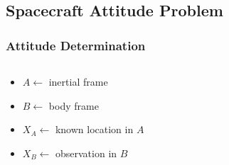 \documentclass[11pt]{beamer}
\begin{document}
    \subsection{Spacecraft Attitude Problem}\label{subsec:spacecraftAttitudeProblem}
    \begin{frame}
        \frametitle{Attitude Determination}
        \begin{columns}
            \begin{column}{0.5\textwidth}
                \begin{itemize}
                    \item $A \gets$ inertial frame \bigskip
                    \item $B \gets$ body frame \bigskip
                    \item $X_A \gets$ known location in $A$ \bigskip
                    \item $X_B \gets$ observation in $B$ \bigskip
                \end{itemize}
            \end{column}
            \begin{column}{0.55\textwidth}
            \end{column}
        \end{columns} \bigskip
    \end{frame}
\end{document}
